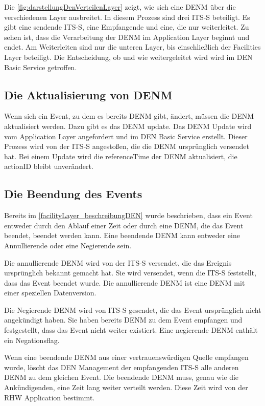 Die \autoref{fig:darstellungDenVerteilenLayer} zeigt, wie sich eine \ac{DENM} über die verschiedenen Layer ausbreitet. In diesem Prozess sind drei \ac{ITS-S} beteiligt. Es gibt eine sendende \ac{ITS-S}, eine Empfangende und eine, die nur weiterleitet. Zu sehen ist, dass die Verarbeitung der \ac{DENM} im Application Layer beginnt und endet. Am Weiterleiten sind nur die unteren Layer, bis einschließlich der Facilities Layer beteiligt. Die Entscheidung, ob und wie weitergeleitet wird wird im \ac{DEN} Basic Service getroffen. 

\subsection{Die Aktualisierung von DENM}
Wenn sich ein Event, zu dem es bereits \ac{DENM} gibt, ändert, müssen die \ac{DENM} aktualisiert werden. Dazu gibt es das \ac{DENM} update. Das \ac{DENM} Update wird vom Application Layer angefordert und im \ac{DEN} Basic Service erstellt. Dieser Prozess wird von der \ac{ITS-S} angestoßen, die die \ac{DENM} ursprünglich versendet hat. Bei einem Update wird die referenceTime der \ac{DENM} aktualisiert, die actionID bleibt unverändert. 

 
\subsection{Die Beendung des Events}
Bereits im \autoref{facilityLayer_beschreibungDEN} wurde beschrieben, dass ein Event entweder durch den Ablauf einer Zeit oder durch eine \ac{DENM}, die das Event beendet, beendet werden kann. Eine beendende \ac{DENM} kann entweder eine Annullierende oder eine Negierende sein. 

Die annullierende \ac{DENM} wird von der \ac{ITS-S} versendet, die das Ereignis ursprünglich bekannt gemacht hat. Sie wird versendet, wenn die \ac{ITS-S} feststellt, dass das Event beendet wurde.  Die annullierende \ac{DENM} ist eine \ac{DENM} mit einer speziellen Datenversion.

Die Negierende \ac{DENM} wird von \ac{ITS-S} gesendet, die das Event ursprünglich nicht angekündigt haben. Sie haben bereits \ac{DENM} zu dem Event empfangen und festgestellt, dass das Event nicht weiter existiert. Eine negierende \ac{DENM} enthält ein Negationsflag. 

Wenn eine beendende \ac{DENM} aus einer vertrauenswürdigen Quelle empfangen wurde, löscht das \ac{DEN} Management der empfangenden \ac{ITS-S} alle anderen \ac{DENM} zu dem gleichen Event. Die beendende \ac{DENM} muss, genau wie die Ankündigenden, eine Zeit lang weiter verteilt werden. Diese Zeit wird von der \ac{RHW} Application bestimmt.

